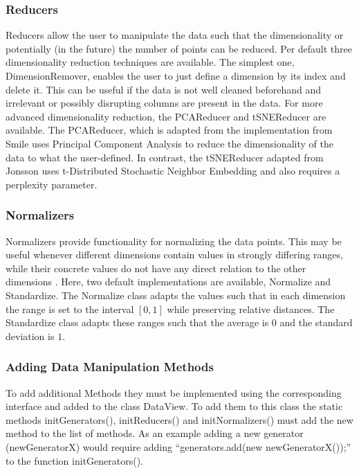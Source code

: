 \documentclass[
	a4paper,
	english,
	twoside,
	openright,               
	11pt                            
	]{report}
\begin{document}
\subsubsection{Reducers}
Reducers allow the user to manipulate the data such that the dimensionality or potentially (in the future) the number of points can be reduced. Per default three dimensionality reduction techniques are available. The simplest one, DimensionRemover, enables the user to just define a dimension by its index and delete it. This can be useful if the data is not well cleaned beforehand and irrelevant or possibly disrupting columns are present in the data. For more advanced dimensionality reduction, the PCAReducer and tSNEReducer are available. The PCAReducer, which is adapted from the implementation from Smile \cite{javasmile} uses Principal Component Analysis \cite{pca} to reduce the dimensionality of the data to what the user-defined. In contrast, the tSNEReducer adapted from Jonsson \cite{javatsne} uses t-Distributed Stochastic Neighbor Embedding \cite{Maaten2008VisualizingDU} and also requires a perplexity parameter.

\subsubsection{Normalizers}
Normalizers provide functionality for normalizing the data points. This may be useful whenever different dimensions contain values in strongly differing ranges, while their concrete values do not have any direct relation to the other dimensions \cite{normalization}. Here, two default implementations are available, Normalize and Standardize. The Normalize class adapts the values such that in each dimension the range is set to the interval $[0,1]$ while preserving relative distances. The Standardize class adapts these ranges such that the average is $0$ and the standard deviation is $1$.

\subsubsection*{Adding Data Manipulation Methods}
To add additional Methods they must be implemented using the corresponding interface and added to the class DataView. To add them to this class the static methods initGenerators(), initReducers() and initNormalizers() must add the new method to the list of methods. As an example adding a new generator (newGeneratorX) would require adding ``generators.add(new newGeneratorX());'' to the function initGenerators().
\end{document}
